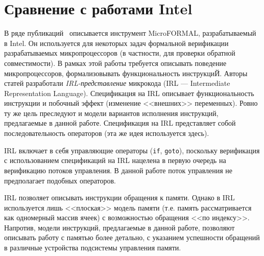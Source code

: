\section{Сравнение с работами Intel}

В ряде публикаций~\cite{MicroFORMAL} описывается инструмент MicroFORMAL, разрабатываемый в Intel. Он используется для некоторых задач формальной верификации разрабатываемых микропроцессоров (в частности, для проверки обратной совместимости). В рамках этой работы требуется описывать поведение микропроцессоров, формализовывать функциональность инструкциЙ. Авторы статей разработали \emph{IRL-представление} микрокода (IRL --- Intermediate Representation Language). Спецификация на IRL описывает функциональность инструкции и побочный эффект (изменение <<внешних>> переменных). Ровно ту же цель преследуют и модели вариантов исполнения инструкций, предлагаемые в данной работе. Спецификация на IRL представляет собой последовательность операторов (эта же идея используется здесь).

IRL включает в себя управляющие операторы (\texttt{if}, \texttt{goto}), поскольку верификация с использованием спецификаций на IRL нацелена в первую очередь на верификацию потоков управления. В данной работе поток управления не предполагает подобных операторов.

IRL позволяет описывать инструкции обращения к памяти. Однако в IRL используется лишь <<плоская>> модель памяти (т.е. память рассматривается как одномерный массив ячеек) с возможностью обращения <<по индексу>>. Напротив, модели инструкций, предлагаемые в данной работе, позволяют описывать работу с памятью более детально, с указанием успешности обращений в различные устройства подсистемы управления памяти.
